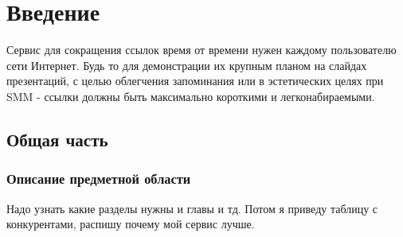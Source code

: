\documentclass[a5paper,12pt]{extreport}
\begin{document}

    \chapter{Введение}
    Сервис для сокращения ссылок время от времени нужен каждому пользователю сети Интернет. Будь то для демонстрации их
    крупным планом на слайдах презентаций, с целью облегчения запоминания или в эстетических целях при SMM
     - ссылки должны быть максимально короткими и легконабираемыми.
    \section{Общая часть}
    \subsection{Описание предметной области}
    Надо узнать какие разделы нужны и главы и тд.
    Потом я приведу таблицу с конкурентами, распишу почему мой сервис лучше.
\end{document}
